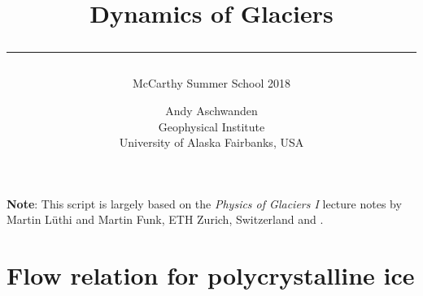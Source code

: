 \documentclass[11pt,halfparskip]{scrartcl}
\begin{document}
\title{Dynamics of Glaciers\\[.5em]
\rule[1.em]{\textwidth}{2pt}
\subtitle{McCarthy Summer School 2018}}

\date{}

\author{
  \small Andy Aschwanden\\[-.5em] 
  \small Geophysical Institute\\[-.5em] 
  \small University of Alaska Fairbanks, USA}


\maketitle

\textbf{Note}: This script is largely based on the \emph{Physics of
Glaciers I} lecture notes by Martin L\"uthi and Martin Funk, ETH
Zurich, Switzerland and \cite{GreveBlatter_disg}.

\vspace{1em}

\section{Flow relation for polycrystalline ice}
\label{sec:flow-law-ice}
\end{document}
